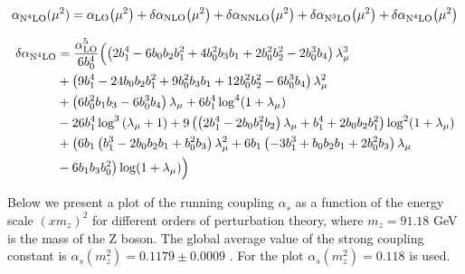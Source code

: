\documentclass[../main.tex]{subfiles}
\begin{document}
\begin{equation}\label{eq:N4LO}
    \alpha_{\text{N}^4\text{LO}}(\mu^2) = \alpha_{\text{LO}}\qty(\mu^2) + \delta\alpha_{\text{NLO}}\qty(\mu^2)+\delta\alpha_{\text{NNLO}}\qty(\mu^2)+\delta\alpha_{\text{N}^3\text{LO}}\qty(\mu^2) + \delta\alpha_{\text{N}^4\text{LO}}\qty(\mu^2)
\end{equation}

\begin{equation}\label{eq:DN4LO}
    \begin{split}
        \delta\alpha_{\text{N}^4\text{LO}} &= \frac{\alpha_{\text{LO}}^5}{6 b_0^4} \Bigl( \left(2 b_1^4-6 b_0 b_2 b_1^2+4 b_0^2 b_3 b_1 + 2 b_0^2 b_2^2-2 b_0^3 b_4 \right) \lambda _{\mu}^3 \\
        &+ \left( 9 b_1^4-24 b_0 b_2 b_1^2+9 b_0^2 b_3 b_1+12 b_0^2 b_2^2-6 b_0^3 b_4\right) \lambda_{\mu}^2 \\
        &+ \left(6 b_0^2 b_1 b_3-6 b_0^3 b_4\right) \lambda_{\mu} + 6 b_1^4 \log ^4(1+ \lambda_{\mu})\\
        &- 26 b_1^4 \log ^3\left(\lambda _{\mu }+1\right)+9 \left(\left(2 b_1^4-2 b_0 b_1^2 b_2\right) \lambda _{\mu } + b_1^4+2 b_0 b_2 b_1^2\right) \log ^2(1+\lambda _{\mu})\\
        &+ \bigl(6 b_1 \left(b_1^3-2 b_0 b_2 b_1+b_0^2 b_3\right) \lambda _{\mu }^2
        + 6 b_1 \left(-3 b_1^3+b_0 b_2 b_1+2 b_0^2 b_3\right) \lambda_{\mu}\\
        &- 6 b_1 b_3 b_0^2 \bigr) \log(1+\lambda _{\mu }) \Bigr)
    \end{split}
\end{equation}


Below we present a plot of the running coupling $\alpha_s$ as a function of the energy scale $(x m_z)^2$ for different orders of perturbation theory,
where $m_z=91.18$ GeV is the mass of the Z boson. The global average value of the strong coupling constant is $\alpha_s(m_z^2) = 0.1179 \pm 0.0009$ \cite{PDG2022}.
For the plot $\alpha_s(m_z^2) = 0.118$ is used.  
\end{document}
